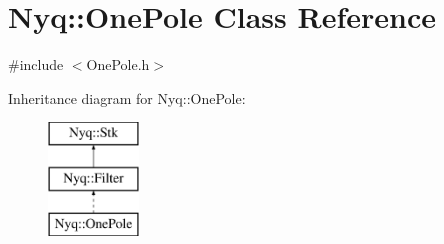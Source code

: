 \hypertarget{class_nyq_1_1_one_pole}{}\section{Nyq\+:\+:One\+Pole Class Reference}
\label{class_nyq_1_1_one_pole}


{\ttfamily \#include $<$One\+Pole.\+h$>$}

Inheritance diagram for Nyq\+:\+:One\+Pole\+:\begin{figure}[H]
\begin{center}
\leavevmode
\includegraphics[height=3.000000cm]{class_nyq_1_1_one_pole}
\end{center}
\end{figure}
